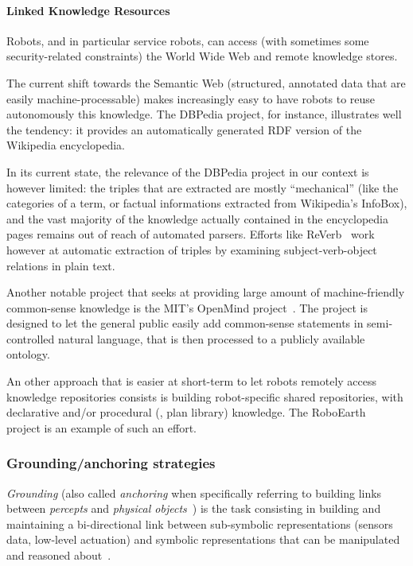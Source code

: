 \paragraph{Linked Knowledge Resources}
\label{sect|lod}

Robots, and in particular service robots, can access (with sometimes some
security-related constraints) the World Wide Web and remote knowledge stores.

The current shift towards the Semantic Web (\ie structured, annotated data that
are easily machine-processable) makes increasingly easy to have robots to reuse
autonomously this knowledge. The DBPedia project, for instance, illustrates
well the tendency: it provides an automatically generated RDF version of the
Wikipedia encyclopedia.

In its current state, the relevance of the DBPedia project in our context is
however limited: the triples that are extracted are mostly ``mechanical'' (like
the categories of a term, or factual informations extracted from Wikipedia's
InfoBox), and the vast majority of the knowledge actually contained in the
encyclopedia pages remains out of reach of automated parsers. Efforts like {\sc
ReVerb}~\cite{Fader2011} work however at automatic extraction of triples by
examining subject-verb-object relations in plain text.

Another notable project that seeks at providing large amount of
machine-friendly common-sense knowledge is the MIT's OpenMind
project~\cite{Singh2002}. The project is designed to let the general public
easily add common-sense statements in semi-controlled natural language, that is
then processed to a publicly available ontology.

An other approach that is easier at short-term to let robots remotely access
knowledge repositories consists is building robot-specific shared repositories,
with declarative and/or procedural (\ie, plan library) knowledge. The
RoboEarth~\cite{Waibel2011} project is an example of such an effort.

\subsubsection{Grounding/anchoring strategies}
\label{sect|grounding}

\emph{Grounding} (also called \emph{anchoring} when specifically referring to
building links between \emph{percepts} and \emph{physical
objects}~\cite{Coradeschi2003}) is the task consisting in building and
maintaining a bi-directional link between sub-symbolic representations (sensors
data, low-level actuation) and symbolic representations that can be
manipulated and reasoned about~\cite{Harnad1990}.

